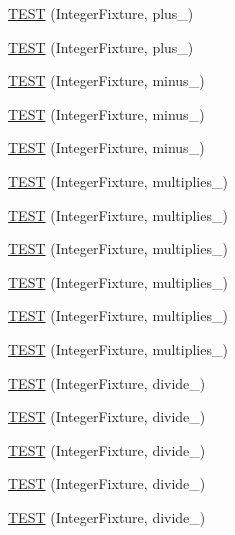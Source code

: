 \begin{DoxyCompactItemize}
\item 
\hyperlink{bmk447-TestInteger_8c_09_09_ad03208e58b9eef087cde74731ea07ea2}{T\-E\-S\-T} (Integer\-Fixture, plus\-\_)
\item 
\hyperlink{bmk447-TestInteger_8c_09_09_a5a765a1610e8accb499b8c9cc326b8bd}{T\-E\-S\-T} (Integer\-Fixture, plus\-\_)
\item 
\hyperlink{bmk447-TestInteger_8c_09_09_a66b76ebde47a0ba4baf1e86b594f9b6b}{T\-E\-S\-T} (Integer\-Fixture, minus\-\_)
\item 
\hyperlink{bmk447-TestInteger_8c_09_09_abc50c0136b8f986105ddb45228e0e588}{T\-E\-S\-T} (Integer\-Fixture, minus\-\_)
\item 
\hyperlink{bmk447-TestInteger_8c_09_09_a7d88a5482163de39f2bef6f917b6cf05}{T\-E\-S\-T} (Integer\-Fixture, minus\-\_)
\item 
\hyperlink{bmk447-TestInteger_8c_09_09_a52490569c8c649dc4ea3c13a951efa87}{T\-E\-S\-T} (Integer\-Fixture, multiplies\-\_)
\item 
\hyperlink{bmk447-TestInteger_8c_09_09_a9b9d314f2b870242605005cd5eb9759d}{T\-E\-S\-T} (Integer\-Fixture, multiplies\-\_)
\item 
\hyperlink{bmk447-TestInteger_8c_09_09_a36932743fa35b401741d33e46e51e4f8}{T\-E\-S\-T} (Integer\-Fixture, multiplies\-\_)
\item 
\hyperlink{bmk447-TestInteger_8c_09_09_a229a726c89974a46e594b28a61b51933}{T\-E\-S\-T} (Integer\-Fixture, multiplies\-\_)
\item 
\hyperlink{bmk447-TestInteger_8c_09_09_a0095bfbc5d9a6c19e76389d113aba7df}{T\-E\-S\-T} (Integer\-Fixture, multiplies\-\_)
\item 
\hyperlink{bmk447-TestInteger_8c_09_09_aa85c30ebcf3b04d03b587542cbcf4802}{T\-E\-S\-T} (Integer\-Fixture, multiplies\-\_)
\item 
\hyperlink{bmk447-TestInteger_8c_09_09_a8f50ec3851e8d2f79849a0de878e624b}{T\-E\-S\-T} (Integer\-Fixture, divide\-\_)
\item 
\hyperlink{bmk447-TestInteger_8c_09_09_a6807f37566bc55344ca3271f3a385eb5}{T\-E\-S\-T} (Integer\-Fixture, divide\-\_)
\item 
\hyperlink{bmk447-TestInteger_8c_09_09_aef4b9a0a9040642123a311675860aa9d}{T\-E\-S\-T} (Integer\-Fixture, divide\-\_)
\item 
\hyperlink{bmk447-TestInteger_8c_09_09_a94adfa9c191aae162e9c8a73756f0eae}{T\-E\-S\-T} (Integer\-Fixture, divide\-\_)
\item 
\hyperlink{bmk447-TestInteger_8c_09_09_a939be6f05bcb4ddbbcdce2e3e4b35588}{T\-E\-S\-T} (Integer\-Fixture, divide\-\_)

\end{DoxyCompactItemize}
